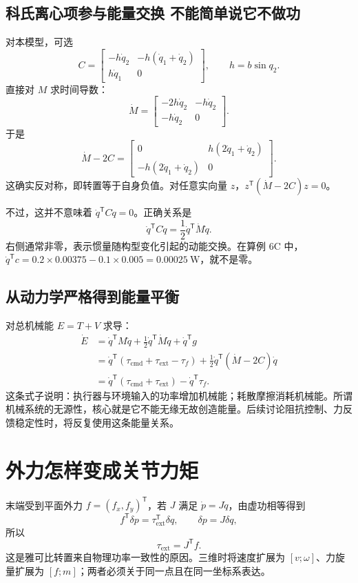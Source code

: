 \subsection{科氏离心项参与能量交换 不能简单说它不做功}
对本模型，可选
\begin{equation}
 C=\begin{bmatrix}-h\dot q_2&-h(\dot q_1+\dot q_2)\\h\dot q_1&0\end{bmatrix},\qquad h=b\sin q_2.
\end{equation}
直接对 $M$ 求时间导数：
\[
 \dot M=\begin{bmatrix}-2h\dot q_2&-h\dot q_2\\-h\dot q_2&0\end{bmatrix}.
\]
于是
\[
 \dot M-2C=\begin{bmatrix}0&h(2\dot q_1+\dot q_2)\\-h(2\dot q_1+\dot q_2)&0\end{bmatrix}.
\]
这确实反对称，即转置等于自身负值。对任意实向量 $z$，$z^{\mathsf T}(\dot M-2C)z=0$。

不过，这并不意味着 $\dot q^{\mathsf T}C\dot q=0$。正确关系是
\begin{equation}
 \dot q^{\mathsf T}C\dot q=\frac12\dot q^{\mathsf T}\dot M\dot q.
\end{equation}
右侧通常非零，表示惯量随构型变化引起的动能交换。在算例 6C 中，$\dot q^{\mathsf T}c=0.2\times0.00375-0.1\times0.005=0.00025\ \mathrm W$，就不是零。

\subsection{从动力学严格得到能量平衡}
对总机械能 $E=T+V$ 求导：
\begin{align}
 \dot E&=\dot q^{\mathsf T}M\ddot q+\tfrac12\dot q^{\mathsf T}\dot M\dot q+\dot q^{\mathsf T}g\\
 &=\dot q^{\mathsf T}(\tau_{\mathrm{cmd}}+\tau_{\mathrm{ext}}-\tau_f)
 +\tfrac12\dot q^{\mathsf T}(\dot M-2C)\dot q\\
 &=\dot q^{\mathsf T}(\tau_{\mathrm{cmd}}+\tau_{\mathrm{ext}})-\dot q^{\mathsf T}\tau_f.
\end{align}
这条式子说明：执行器与环境输入的功率增加机械能；耗散摩擦消耗机械能。所谓机械系统的无源性，核心就是它不能无缘无故创造能量。后续讨论阻抗控制、力反馈稳定性时，将反复使用这条能量关系。

\section{外力怎样变成关节力矩}
末端受到平面外力 $f=(f_x,f_y)^{\mathsf T}$，若 $J$ 满足 $\dot p=J\dot q$，由虚功相等得到
\[
 f^{\mathsf T}\delta p=\tau_{\mathrm{ext}}^{\mathsf T}\delta q,\qquad
 \delta p=J\delta q,
\]
所以
\begin{equation}
 \tau_{\mathrm{ext}}=J^{\mathsf T}f.
\end{equation}
这是雅可比转置来自物理功率一致性的原因。三维时将速度扩展为 $[v;\omega]$、力旋量扩展为 $[f;m]$；两者必须关于同一点且在同一坐标系表达。

